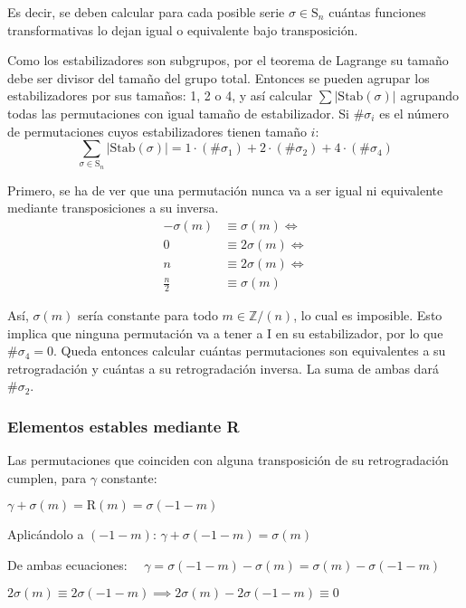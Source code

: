 		Es decir, se deben calcular para cada posible serie $\sigma\in\mbox{S}_n$ cuántas funciones transformativas lo dejan igual o equivalente bajo transposición.
		
		Como los estabilizadores son subgrupos, por el teorema de Lagrange su tamaño debe ser divisor del tamaño del grupo total. Entonces se pueden agrupar los estabilizadores por sus tamaños: 1, 2 o 4, y así calcular $\sum|\mbox{Stab}(\sigma)|$ agrupando todas las permutaciones con igual tamaño de estabilizador. Si $\#\sigma_i$ es el número de permutaciones cuyos estabilizadores tienen tamaño $i$:		
		\[\sum_{\sigma\in\mbox{S}_n}|\mbox{Stab}(\sigma)|=1\cdot(\#\sigma_1)+2\cdot(\#\sigma_2)+4\cdot(\#\sigma_4)\]
	
		Primero, se ha de ver que una permutación nunca va a ser igual ni equivalente mediante transposiciones a su inversa.	\label{inversano}
			\begin{align*}
			-\sigma(m)&\equiv\sigma(m)\Longleftrightarrow\\
			0&\equiv2\sigma(m)\Longleftrightarrow\\
			n&\equiv2\sigma(m)\Longleftrightarrow\\
			\frac{n}{2}&\equiv\sigma(m)
			\end{align*}
		
		Así, $\sigma(m)$ sería constante para todo $m\in \mathbb{Z} / (n)$, lo cual es imposible. Esto implica que ninguna permutación va a tener a I en su estabilizador, por lo que $\#\sigma_4=0$. Queda entonces calcular cuántas permutaciones son equivalentes a su retrogradación y cuántas a su retrogradación inversa. La suma de ambas dará $\#\sigma_2$.
	
	\subsubsection{Elementos estables mediante R}
		Las permutaciones que coinciden con alguna transposición de su retrogradación cumplen, para $\gamma$ constante:
		
		\hspace*{8.5\bigskipamount} $\gamma+\sigma(m) = \mbox{R}(m) = \sigma(-1-m)$
		
		Aplicándolo a $(-1-m)$:
		$\gamma+\sigma(-1-m) = \sigma(m)$
		
		De ambas ecuaciones: $\quad\gamma=\sigma(-1-m)-\sigma(m)=\sigma(m)-\sigma(-1-m)$
		
		$2\sigma(m)\equiv2\sigma(-1-m)\implies2\sigma(m)-2\sigma(-1-m)\equiv0$
		
